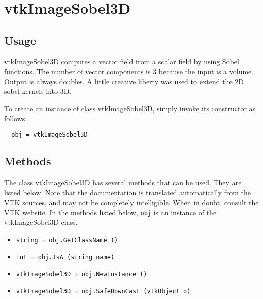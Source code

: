 \section{vtkImageSobel3D}

\subsection{Usage}

 vtkImageSobel3D computes a vector field from a scalar field by using
 Sobel functions.  The number of vector components is 3 because
 the input is a volume.  Output is always doubles.  A little creative 
 liberty was used to extend the 2D sobel kernels into 3D.

To create an instance of class vtkImageSobel3D, simply
invoke its constructor as follows
\begin{verbatim}
  obj = vtkImageSobel3D
\end{verbatim}
\subsection{Methods}

The class vtkImageSobel3D has several methods that can be used.
  They are listed below.
Note that the documentation is translated automatically from the VTK sources,
and may not be completely intelligible.  When in doubt, consult the VTK website.
In the methods listed below, \verb|obj| is an instance of the vtkImageSobel3D class.
\begin{itemize}
\item  \verb|string = obj.GetClassName ()|

\item  \verb|int = obj.IsA (string name)|

\item  \verb|vtkImageSobel3D = obj.NewInstance ()|

\item  \verb|vtkImageSobel3D = obj.SafeDownCast (vtkObject o)|

\end{itemize}
